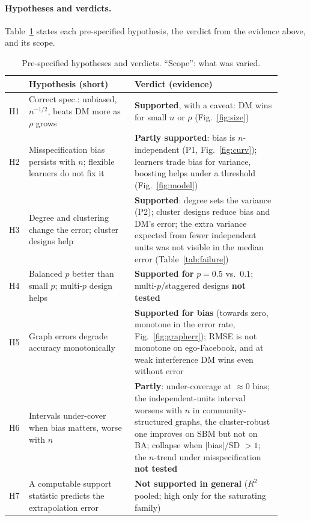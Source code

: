 \paragraph{Hypotheses and verdicts.}
Table~\ref{tab:hyp} states each pre-specified hypothesis, the verdict from the evidence above, and its scope.
\begin{table}[H]
\centering\small
\caption{Pre-specified hypotheses and verdicts. ``Scope'': what was varied.}
\label{tab:hyp}
\begin{tabular}{@{}p{0.04\linewidth}p{0.36\linewidth}p{0.5\linewidth}@{}}
\toprule
 & Hypothesis (short) & Verdict (evidence) \\
\midrule
H1 & Correct spec.: unbiased, $n^{-1/2}$, beats DM more as $\rho$ grows & \textbf{Supported}, with a caveat: DM wins for small $n$ or $\rho$ (Fig.~\ref{fig:size}) \\
H2 & Misspecification bias persists with $n$; flexible learners do not fix it & \textbf{Partly supported}: bias is $n$-independent (P1, Fig.~\ref{fig:curv}); learners trade bias for variance, boosting helps under a threshold (Fig.~\ref{fig:model}) \\
H3 & Degree and clustering change the error; cluster designs help & \textbf{Supported}: degree sets the variance (P2); cluster designs reduce bias and DM's error; the extra variance expected from fewer independent units was not visible in the median error (Table~\ref{tab:failure}) \\
H4 & Balanced $p$ better than small $p$; multi-$p$ design helps & \textbf{Supported for} $p=0.5$ vs.\ $0.1$; multi-$p$/staggered designs \textbf{not tested} \\
H5 & Graph errors degrade accuracy monotonically & \textbf{Supported for bias} (towards zero, monotone in the error rate, Fig.~\ref{fig:grapherr}); RMSE is not monotone on ego-Facebook, and at weak interference DM wins even without error \\
H6 & Intervals under-cover when bias matters, worse with $n$ & \textbf{Partly}: under-coverage at $\approx0$ bias; the independent-units interval worsens with $n$ in community-structured graphs, the cluster-robust one improves on SBM but not on BA; collapse when $|$bias$|$/SD $>1$; the $n$-trend under misspecification \textbf{not tested} \\
H7 & A computable support statistic predicts the extrapolation error & \textbf{Not supported in general} ($R^2$ \HsevenPooled{} pooled; high only for the saturating family) \\
\bottomrule
\end{tabular}
\end{table}
